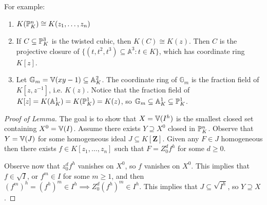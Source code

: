\documentclass[10pt,a4paper,rgb]{article}
\newcommand{\A}{\mathbb{A}}
\begin{document}
For example:
\begin{enumerate}
\item $K(\P^n_K) \cong K(z_1, \ldots, z_n)$
\item If $C \subseteq \P^3_K$ is the twisted cubic, then $K(C) \cong K(z)$. Then $C$ is the projective closure of $\{(t, t^2, t^3) \subseteq \A^3 : t \in K\}$, which has coordinate ring $K[z]$.
\item Let $\mathbb{G}_m = \V(xy-1) \subseteq \mathbb{A}^2_K$. The coordinate ring of $\mathbb{G}_m$ is the fraction field of $K[z, z^{-1}]$, i.e. $K(z)$. Notice that the fraction field of $K[z] = K(\A^1_K) = K(\P^1_K) = K(z)$, so $\mathbb{G}_m \subseteq \A^1_K \subseteq \P^1_K$.
\end{enumerate}

\begin{proof}[Proof of Lemma]
The goal is to show that $X = \V(I^h)$ is the smallest closed set containing $X^0 = \V(I)$. Assume there exists $Y \supseteq X^0$ closed in $\P^n_K$. Observe that $Y = \V(J)$ for some homogeneous ideal $J \subseteq K[\mathbf{Z}]$. Given any $F \in J$ homogeneous then there exists $f \in K[z_1, \ldots, z_n]$ such that $F = Z_0^d f^h$ for some $d \geq 0$. 

Observe now that $z_0^d f^h$ vanishes on $X^0$, so $f$ vanishes on $X^0$. This implies that $f \in \sqrt{I}$, or $f^m \in I$ for some $m \geq 1$, and then $(f^m)^h = (f^h)^m \in I^h \implies Z_0^d (f^h)^m \in I^h$. This implies that $J \subseteq \sqrt{I^h}$, so $Y \supseteq X$.
\end{proof}
\end{document}
